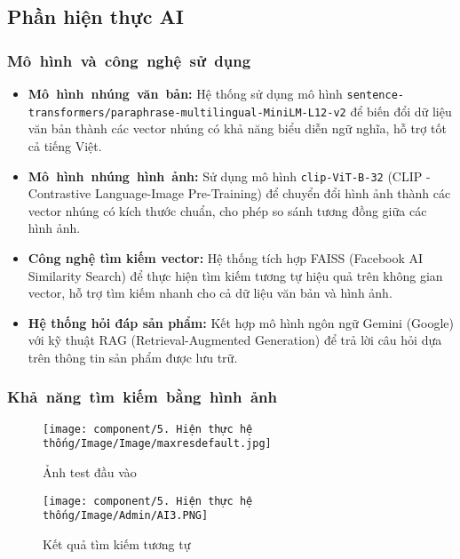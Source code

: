 \subsection{Phần hiện thực AI}
\subsubsection{\mbox{Mô hình và công nghệ sử dụng}}
\begin{itemize}
    \item \textbf{\mbox{Mô hình nhúng văn bản:}} Hệ thống sử dụng mô hình 
    \mbox{\texttt{sentence-transformers/paraphrase-multilingual-MiniLM-L12-v2}} 
    để biến đổi dữ liệu văn bản thành các vector nhúng có khả năng biểu diễn ngữ nghĩa, 
    hỗ trợ tốt cả tiếng Việt.
    
    \item \textbf{\mbox{Mô hình nhúng hình ảnh:}} Sử dụng mô hình \mbox{\texttt{clip-ViT-B-32}} 
    (CLIP - Contrastive Language-Image Pre-Training) để chuyển đổi hình ảnh thành 
    các vector nhúng có kích thước chuẩn, cho phép so sánh tương đồng giữa các hình ảnh.
    
    \item \textbf{Công nghệ tìm kiếm vector:} Hệ thống tích hợp FAISS 
    (Facebook AI Similarity Search) để thực hiện tìm kiếm tương tự hiệu quả 
    trên không gian vector, hỗ trợ tìm kiếm nhanh cho cả dữ liệu văn bản và hình ảnh.
    
    \item \textbf{Hệ thống hỏi đáp sản phẩm:} Kết hợp mô hình ngôn ngữ Gemini (Google) 
    với kỹ thuật RAG (Retrieval-Augmented Generation) để trả lời câu hỏi 
    dựa trên thông tin sản phẩm được lưu trữ.
\end{itemize}

\subsubsection{\mbox{Khả năng tìm kiếm bằng hình ảnh}}
\begin{figure}[H]
    \begin{center}
    \texttt{[image: component/5. Hiện thực hệ thống/Image/Image/maxresdefault.jpg]}
    \end{center}
    \caption{Ảnh test đầu vào}
\end{figure}
\begin{figure}[H]
    \begin{center}
    \texttt{[image: component/5. Hiện thực hệ thống/Image/Admin/AI3.PNG]}
    \end{center}
    \caption{Kết quả tìm kiếm tương tự}
\end{figure}

